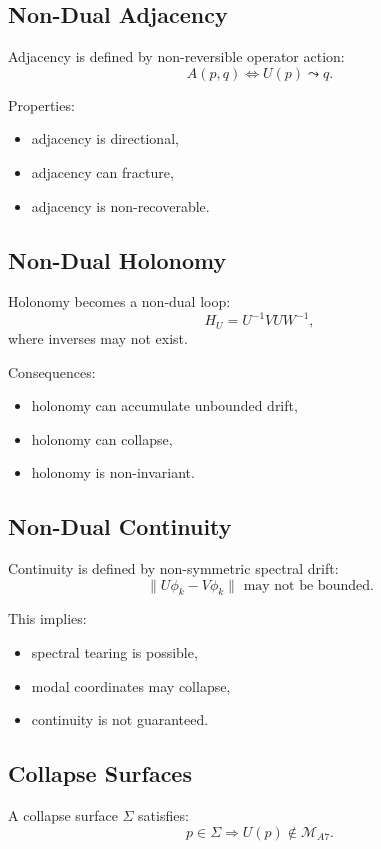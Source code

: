 \subsection{Non-Dual Adjacency}

Adjacency is defined by non-reversible operator action:
\[
A(p,q) \iff U(p) \leadsto q.
\]

Properties:
\begin{itemize}
  \item adjacency is directional,
  \item adjacency can fracture,
  \item adjacency is non-recoverable.
\end{itemize}

\subsection{Non-Dual Holonomy}

Holonomy becomes a non-dual loop:
\[
H_U = U^{-1} V U W^{-1},
\]
where inverses may not exist.

Consequences:
\begin{itemize}
  \item holonomy can accumulate unbounded drift,
  \item holonomy can collapse,
  \item holonomy is non-invariant.
\end{itemize}

\subsection{Non-Dual Continuity}

Continuity is defined by non-symmetric spectral drift:
\[
\| U\phi_k - V\phi_k \| \text{ may not be bounded.}
\]

This implies:
\begin{itemize}
  \item spectral tearing is possible,
  \item modal coordinates may collapse,
  \item continuity is not guaranteed.
\end{itemize}

\subsection{Collapse Surfaces}

A collapse surface $\Sigma$ satisfies:
\[
p \in \Sigma \Rightarrow U(p) \notin \mathcal{M}_{A7}.
\]

